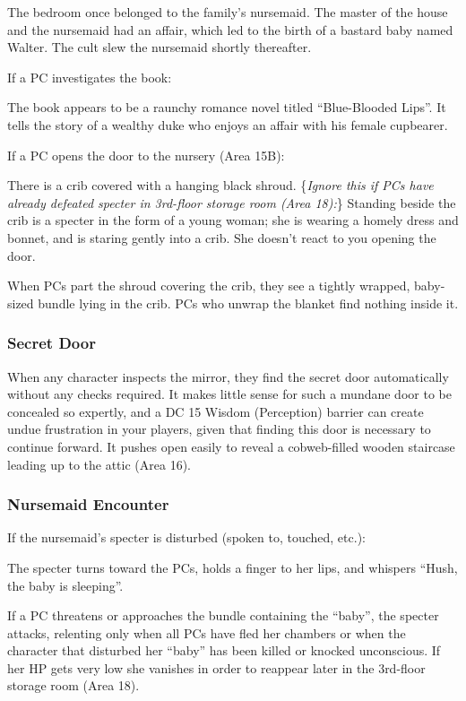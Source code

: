 The bedroom once belonged to the family's nursemaid. The master of the house and the nursemaid had an affair,
which led to the birth of a bastard baby named Walter. The cult slew the nursemaid shortly thereafter.

If a PC investigates the book:
\begin{readout}
  The book appears to be a raunchy romance novel titled ``Blue-Blooded Lips''. It tells the story of a wealthy
  duke who enjoys an affair with his female cupbearer.
\end{readout}
If a PC opens the door to the nursery (Area 15B):
\begin{readout}
  There is a crib covered with a hanging black shroud. \{\textit{Ignore this if PCs have already defeated
  specter in 3rd-floor storage room (Area 18):}\} Standing beside the crib is a specter in the form
  of a young woman; she is wearing a homely dress and bonnet, and is staring gently into a crib.
  She doesn't react to you opening the door.
\end{readout}
When PCs part the shroud covering the crib, they see a tightly wrapped, baby-sized bundle lying in the crib.
PCs who unwrap the blanket find nothing inside it.

\subsubsection*{Secret Door}
When any character inspects the mirror, they find the secret door automatically without any checks required.
It makes little sense for such a mundane door to be concealed so expertly, and a DC 15 Wisdom (Perception)
barrier can create undue frustration in your players, given that finding this door is necessary to continue
forward. It pushes open easily to reveal a cobweb-filled wooden staircase leading up to the attic (Area 16).

\subsubsection*{Nursemaid Encounter}
If the nursemaid's specter is disturbed (spoken to, touched, etc.):
\begin{readout}
  The specter turns toward the PCs, holds a finger to her lips, and whispers ``Hush, the baby is sleeping''.
\end{readout}
If a PC threatens or approaches the bundle containing the ``baby'', the specter attacks, relenting only when
all PCs have fled her chambers or when the character that disturbed her ``baby'' has been killed or knocked
unconscious. If her HP gets very low she vanishes in order to reappear later in the 3rd-floor storage room
(Area 18).

